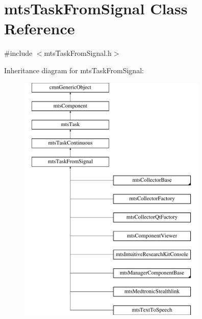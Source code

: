 \hypertarget{classmts_task_from_signal}{\section{mts\-Task\-From\-Signal Class Reference}
\label{classmts_task_from_signal}
}


{\ttfamily \#include $<$mts\-Task\-From\-Signal.\-h$>$}

Inheritance diagram for mts\-Task\-From\-Signal\-:\begin{figure}[H]
\begin{center}
\leavevmode
\includegraphics[height=12.000000cm]{de/d71/classmts_task_from_signal}
\end{center}
\end{figure}
